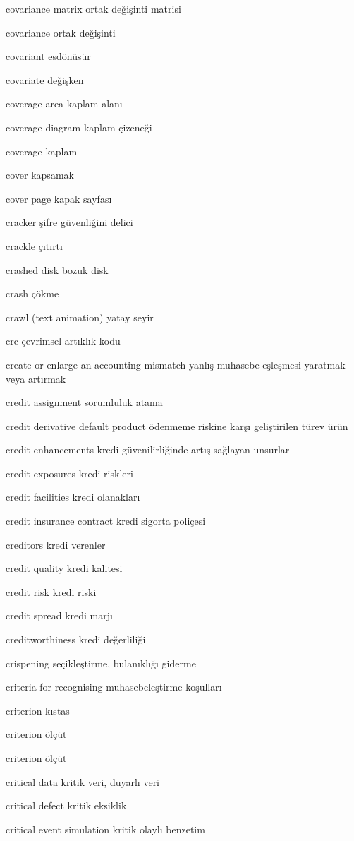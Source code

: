 \documentclass[12pt,fleqn]{article}\usepackage{../../common}
\begin{document}
covariance matrix ortak değişinti matrisi

covariance ortak değişinti

covariant esdönüsür

covariate değişken

coverage area kaplam alanı

coverage diagram kaplam çizeneği

coverage kaplam

cover kapsamak

cover page kapak sayfası

cracker şifre güvenliğini delici

crackle çıtırtı

crashed disk bozuk disk

crash çökme

crawl (text animation) yatay seyir

crc çevrimsel artıklık kodu

create or enlarge an accounting mismatch yanlış muhasebe eşleşmesi yaratmak veya artırmak

credit assignment sorumluluk atama

credit derivative default product ödenmeme riskine karşı geliştirilen türev ürün

credit enhancements kredi güvenilirliğinde artış sağlayan unsurlar

credit exposures kredi riskleri

credit facilities kredi olanakları

credit insurance contract kredi sigorta poliçesi

creditors kredi verenler

credit quality kredi kalitesi

credit risk kredi riski

credit spread kredi marjı

creditworthiness kredi değerliliği

crispening seçikleştirme, bulanıklığı giderme

criteria for recognising muhasebeleştirme koşulları

criterion kıstas

criterion ölçüt

criterion ölçüt

critical data kritik veri, duyarlı veri

critical defect kritik eksiklik

critical event simulation kritik olaylı benzetim
\end{document}
